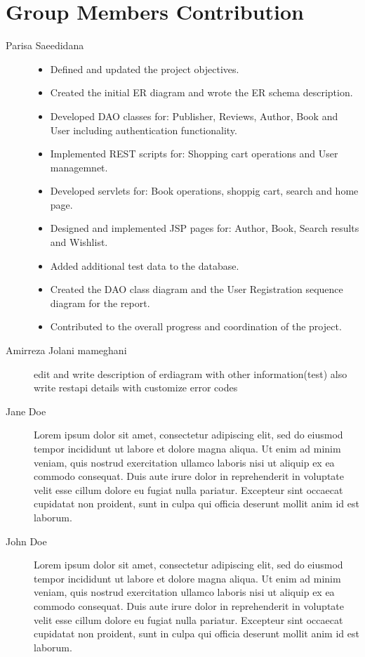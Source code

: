 \section{Group Members Contribution}


\begin{description}
	\item[Parisa Saeedidana]
	    \begin{itemize}
		\item Defined and updated the project objectives.
		\item Created the initial ER diagram and wrote the ER schema description.
		\item Developed DAO classes for: Publisher, Reviews, Author, Book and User including authentication functionality.
		\item Implemented REST scripts for: Shopping cart operations and User managemnet.
		\item Developed servlets for: Book operations, shoppig cart, search and home page.
		\item Designed and implemented JSP pages for: Author, Book, Search results and Wishlist.
		\item Added additional test data to the database.
		\item Created the DAO class diagram and the User Registration sequence diagram for the report.
		\item Contributed to the overall progress and coordination of the project.
		\end{itemize}
	\item[Amirreza Jolani mameghani] edit and write description of erdiagram with other information(test) also write  restapi details with customize error codes
	\item[Jane Doe] Lorem ipsum dolor sit amet, consectetur adipiscing elit, sed do eiusmod tempor incididunt ut labore et dolore magna aliqua. Ut enim ad minim veniam, quis nostrud exercitation ullamco laboris nisi ut aliquip ex ea commodo consequat. Duis aute irure dolor in reprehenderit in voluptate velit esse cillum dolore eu fugiat nulla pariatur. Excepteur sint occaecat cupidatat non proident, sunt in culpa qui officia deserunt mollit anim id est laborum.
	\item[John Doe] Lorem ipsum dolor sit amet, consectetur adipiscing elit, sed do eiusmod tempor incididunt ut labore et dolore magna aliqua. Ut enim ad minim veniam, quis nostrud exercitation ullamco laboris nisi ut aliquip ex ea commodo consequat. Duis aute irure dolor in reprehenderit in voluptate velit esse cillum dolore eu fugiat nulla pariatur. Excepteur sint occaecat cupidatat non proident, sunt in culpa qui officia deserunt mollit anim id est laborum.

\end{description}
